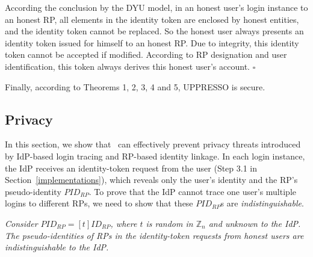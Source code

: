 {According the conclusion by the DYU model,
    in an honest user's login instance to an honest RP,
         all elements in the identity token are enclosed by honest entities,
 and the identity token cannot be replaced.
So the honest user always presents an identity token issued for himself to an honest RP.
Due to integrity, this identity token cannot be accepted if modified.
According to RP designation and user identification,
    this token always derives this honest user's account.
\hfill $\square$

Finally, according to Theorems 1, 2, 3, 4 and 5, UPPRESSO is secure.

\subsection{Privacy}
\label{sec-:analysis}
In this section, we show that \usso~can effectively prevent privacy threats introduced by IdP-based login tracing and RP-based identity linkage. \newc In each login instance, the IdP receives an identity-token request from the user (Step 3.1 in Section~\ref{implementations}), which reveals only the user's identity and the RP's pseudo-identity $PID_{RP}$. To prove that the IdP cannot trace one user's multiple logins to different RPs, we need to show that these $PID_{RP}$s are \emph{indistinguishable}.

\vspace{1mm}
 {\em Consider $PID_{RP} = [t]ID_{RP}$, where $t$ is random in $\mathbb{Z}_n$ and unknown to the IdP. The pseudo-identities of RPs in the identity-token requests from honest users are indistinguishable to the IdP.}

\vspace{0.75mm}
}
